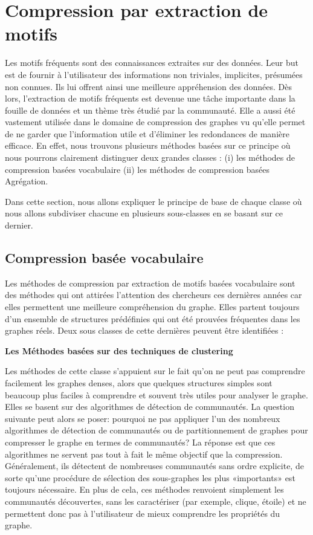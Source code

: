 \documentclass[a4paper,oneside,12pt]{report}
\theoremstyle{definition}
\begin{document}
			\section{Compression par extraction de motifs}
			 Les motifs fréquents sont des connaissances extraites sur des données. Leur but est de fournir à l'utilisateur des informations non triviales, implicites, présumées non connues. Ils lui offrent ainsi une meilleure appréhension des données. Dès lors, l'extraction de motifs fréquents est  devenue une tâche importante dans la fouille de données et un thème très étudié par la communauté. Elle a aussi été vastement %
			 utilisée dans le domaine de compression des graphes vu qu'elle permet de ne garder que l'information utile et d'éliminer les redondances de manière efficace. En effet, nous trouvons plusieurs méthodes basées sur ce principe où nous pourrons clairement distinguer deux grandes classes : 
			 (i) les méthodes de compression basées vocabulaire
			 (ii) les méthodes de compression basées Agrégation.
			 
				Dans cette section, nous allons expliquer le principe de base de chaque classe où nous allons subdiviser chacune en plusieurs sous-classes en se basant sur ce dernier. 
			 
				\subsection{Compression basée vocabulaire}
				Les méthodes de compression par extraction de motifs basées vocabulaire sont des méthodes qui ont attirées l'attention des chercheurs ces dernières années car elles permettent une meilleure compréhension du graphe. Elles partent toujours d'un ensemble de structures prédéfinies qui ont été prouvées fréquentes dans les graphes réels. Deux sous classes de cette dernières peuvent être identifiées :
				 
					 \textbf{Les Méthodes basées sur des techniques de clustering}
							
							Les méthodes de cette classe s'appuient sur le fait qu'on ne peut pas comprendre facilement les graphes denses, alors que quelques structures simples sont beaucoup plus faciles à comprendre et souvent très utiles pour analyser le graphe. Elles se basent sur des algorithmes de détection de communautés. 
							La question suivante peut alors se poser: pourquoi ne pas appliquer l'un des nombreux algorithmes de détection de communautés ou de partitionnement de graphes pour compresser le graphe en termes de communautés? La réponse est que ces algorithmes ne servent pas tout à fait le même objectif que la compression. Généralement, ils détectent de nombreuses communautés sans ordre explicite, de sorte qu'une procédure de sélection des sous-graphes les plus «importants» est toujours nécessaire. En plus de cela, ces méthodes renvoient simplement les communautés découvertes, sans les caractériser (par exemple, clique, étoile) et ne permettent donc pas à l'utilisateur de mieux comprendre les propriétés du graphe. 
							
\end{document}
